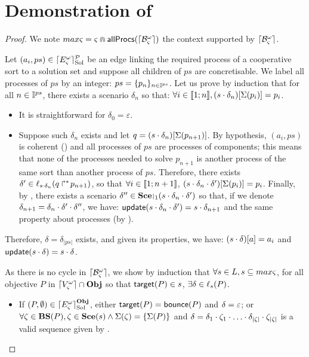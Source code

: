 \appendix

\section{Demonstration of }

\begin{proof} 
We note $max\varsigma = \varsigma \Cap \mathsf{allProcs}(\lceil \mathcal{B}_\varsigma^\omega\rceil)$ the context supported by $\lceil \mathcal{B}_\varsigma^\omega\rceil$.

Let $(a_i, ps) \in \lceil E_\varsigma^\omega\rceil^{\mathcal{P}}_{\mathrm{Sol}}$ be an edge linking the required process of a cooperative sort to a solution set and suppose all children of $ps$ are concretisable.
We label all processes of $ps$ by an integer: $ps = \{ p_n \}_{n \in \mathbb{I}^{ps}}$.
Let us prove by induction that for all $n \in \mathbb{I}^{ps}$, there exists a scenario $\delta_n$ so that:
$\forall i \in \llbracket 1; n \rrbracket, {(s \cdot \delta_n)[\Sigma(p_i)]} = p_i$.
\begin{itemize}
  \item It is straightforward for $\delta_0 = \varepsilon$.
  \item Suppose such $\delta_n$ exists and let $q = {(s \cdot \delta_n)[\Sigma(p_{n+1})]}$.
    By hypothesis, $(a_i, ps)$ is coherent () and all processes of $ps$ are processes of components;
    this means that none of the processes needed to solve $p_{n+1}$ is another process of the same sort than another process of $ps$.
    Therefore, there exists $\delta' \in \ell_{s \cdot \delta_n}(\mbox{$q\Rsh^*\!p_{n+1}$})$,
    so that $\forall i \in \llbracket 1; n+1 \rrbracket$, ${(s \cdot \delta_n \cdot \delta')[\Sigma(p_{i})]} = p_{i}$.
    Finally, by , there exists a scenario $\delta'' \in \restriction{\Sce}{1}(s \PHplay \delta_n \PHplay \delta')$
    so that, if we denote $\delta_{n+1} = \delta_n \cdot \delta' \cdot \delta''$,
    we have: $\mathsf{update}(s \cdot \delta_n \cdot \delta') = s \cdot \delta_{n+1}$ and the same property about processes (by ).
\end{itemize}
Therefore, $\delta = \delta_{|ps|}$ exists, and given its properties, we have: ${(s \cdot \delta)[a]} = a_i$
and $\mathsf{update}(s \cdot \delta) = s \cdot \delta$.

As there is no cycle in $\lceil \mathcal{B}_\varsigma^\omega\rceil$, we show by induction that $\forall s\in L, s\subseteq max\varsigma$, 
for all objective $P$ in $\lceil V_\varsigma^\omega\rceil \cap \mathbf{Obj}$ so that $\mathsf{target}(P) \in s$,
$\exists \delta \in \ell_s(P)$.%
\begin{itemize}
  \item If $(P, \emptyset) \in \lceil E_\varsigma^\omega\rceil^{\mathbf{Obj}}_{\mathrm{Sol}}$, either $\mathsf{target}(P) = \mathsf{bounce}(P)$ and $\delta = \varepsilon$;
    or $\forall \zeta \in \mathbf{BS}(P), \zeta \in \mathbf{Sce}(s) \wedge \Sigma(\zeta) = \{ \Sigma(P) \}$
    and $\delta = \delta_1 \PHplay \zeta_1 \PHplay \dots \PHplay \delta_{|\zeta|} \PHplay \zeta_{|\zeta|}$ is a valid sequence given by .


\end{itemize}
\end{proof}
